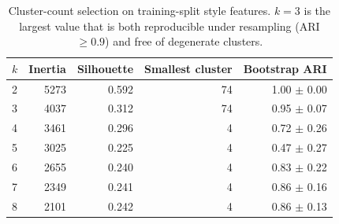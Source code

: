 \begin{table}[t]
\centering
\small
\caption{Cluster-count selection on training-split style features. $k=3$ is the largest value that is both reproducible under resampling (ARI $\geq 0.9$) and free of degenerate clusters.}
\label{tab:kselect}
\begin{tabular}{lrrrr}
\toprule
$k$ & Inertia & Silhouette & Smallest cluster & Bootstrap ARI \\
\midrule
2 & 5273 & 0.592 & 74 & 1.00 $\pm$ 0.00 \\
3 & 4037 & 0.312 & 74 & 0.95 $\pm$ 0.07 \\
4 & 3461 & 0.296 & 4 & 0.72 $\pm$ 0.26 \\
5 & 3025 & 0.225 & 4 & 0.47 $\pm$ 0.27 \\
6 & 2655 & 0.240 & 4 & 0.83 $\pm$ 0.22 \\
7 & 2349 & 0.241 & 4 & 0.86 $\pm$ 0.16 \\
8 & 2101 & 0.242 & 4 & 0.86 $\pm$ 0.13 \\
\bottomrule
\end{tabular}
\end{table}
